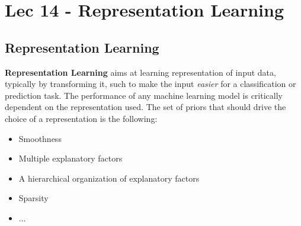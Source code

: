 \chapter{Lec 14 - Representation Learning}
\section{Representation Learning}
\textbf{Representation Learning} aims at learning representation of input data, typically by transforming it, such to make the input \textit{easier} for a classification or prediction task. The performance of any machine learning model is critically dependent on the representation used. The set of priors that should drive the choice of a representation is the following:
\begin{itemize}
    \item Smoothness
    \item Multiple explanatory factors
    \item A hierarchical organization of explanatory factors
    \item Sparsity
    \item ...
\end{itemize}

